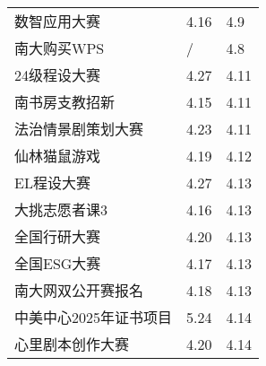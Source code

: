 \documentclass[letterpaper, 12pt]{article}
\begin{document}
\begin{multicols}{2}
{\begin{longtable}{|>{\centering\arraybackslash}m{}|m{}|m{}|}
    数智应用大赛 & 4.16 & 4.9\\
    南大购买WPS & / & 4.8\\
    24级程设大赛 & 4.27 & 4.11\\
    南书房支教招新 & 4.15 & 4.11\\
    法治情景剧策划大赛 & 4.23 & 4.11\\
    仙林猫鼠游戏 & 4.19 & 4.12\\
    EL程设大赛 & 4.27 & 4.13\\
    大挑志愿者课3 & 4.16 & 4.13\\
    全国行研大赛 & 4.20 & 4.13\\
    全国ESG大赛 & 4.17 & 4.13\\
    南大网双公开赛报名 & 4.18 & 4.13\\
    中美中心2025年证书项目 & 5.24 & 4.14\\
    心里剧本创作大赛 & 4.20 & 4.14\\
    \hline
\end{longtable}
\unskip
\unpenalty
\unpenalty}\unvbox\colbbox
\end{multicols}
\end{document}
